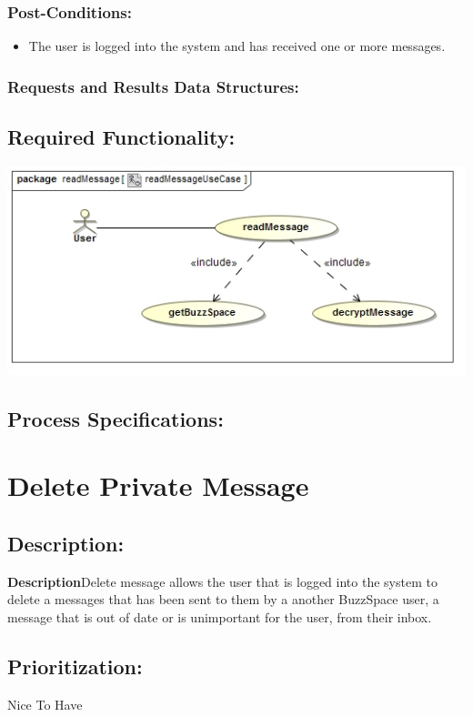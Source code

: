 \documentclass[a4paper,11pt]{article}
\begin{document}
\subsubsection*{Post-Conditions:}
\begin{itemize}
\item The user is logged into the system and has received one or more messages.
\end{itemize}
\subsubsection*{Requests and Results Data Structures:}
\subsection{Required Functionality:} 
\includegraphics[width=1\linewidth]{./Images/PrivateMessage/readMessageUseCase}
\subsection{Process Specifications:} 

\section{Delete Private Message}
\subsection*{Description:}
\textbf{Description}Delete message allows the user that is logged into the system to delete a messages that has been sent to them by a another BuzzSpace user, a message that is out of date or is unimportant for the user, from their inbox.
\subsection{Prioritization:} 
\textbf{}Nice To Have
\end{document}
